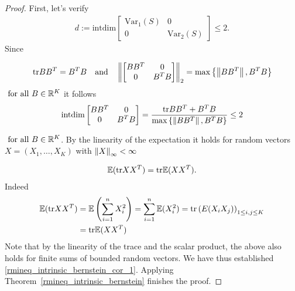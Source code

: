 \begin{proof}
  First, let's verify 
  \begin{gather}
   \label{rmineq_intrinsic_bernstein_cor_1}
    d
    :=
    \text{intdim}
    \begin{bmatrix}
      \text{Var}_1(S) & 0 \\
      0   & \text{Var}_2(S)
    \end{bmatrix}
    \le
    2
    .
  \end{gather}
  Since
 
  \begin{gather}
  \text{tr} 
  B B^T 
  =
  B^T B
  \quad
  \text{and}
  \quad
  \left\lVert
    \begin{bmatrix}
      B B^T & 0 \\
      0   & B^T B
    \end{bmatrix}
  \right\rVert_2
  =
  \max
  \left\{ 
    \left\lVert B B^T\right\rVert,
    B^T B
  \right\}
  \end{gather}
  $
  \text{
  for all 
  }
  B \in \mathbb{R}^K
  $
  it follows
  \begin{align}
    \text{intdim} 
    \begin{bmatrix}
      B B^T & 0 \\
      0   & B^T B
    \end{bmatrix}
    =
  \frac{
    \text{tr}B B^T
    +
    B^T B
  }
  {
  \max
  \left\{ 
    \left\lVert B B^T\right\rVert,
    B^T B
  \right\}
  }
  \le
  2  
  \end{align}

$
  \text{
  for all 
  }
  B \in \mathbb{R}^K
$.
By the linearity of the expectation  
it holds
for random vectors 
$X=(X_1, \ldots, X_K)$
with
$\left\lVert X\right\rVert_\infty < \infty$

\begin{gather}
  \mathbb{E}(\text{tr} X X^T) 
  =
  \text{tr} \mathbb{E} (X X^T). 
\end{gather}
Indeed
\begin{align*}
  \mathbb{E}(\text{tr} X X^T) 
  &=
  \mathbb{E} \left( 
    \sum_{i = 1}^{n}
      X_i^2
  \right)
  =
  \sum_{i = 1}^{n}
    \mathbb{E}(
      X_i^2
    )  
  =
  \text{tr}\left( 
    E(X_i X_j)
  \right)_{1 \le i,j \le K}
  \\
  &=
  \text{tr}
    \mathbb{E}(X X^T)
\end{align*}
Note that by the linearity of the trace and the scalar product, the above also holds for finite sums of bounded random vectors. 
We have thus established \eqref{rmineq_intrinsic_bernstein_cor_1}.
Applying Theorem~\ref{rmineq_intrinsic_bernstein}
finishes the proof.
\end{proof}
